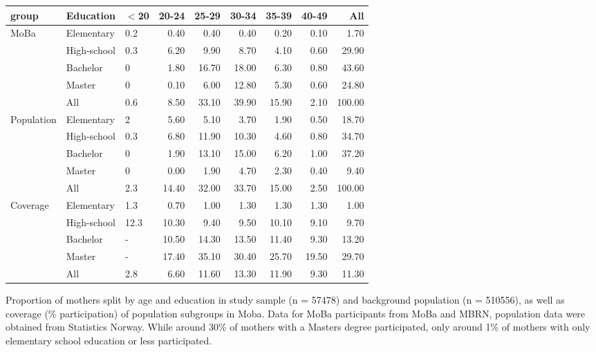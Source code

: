 
\centering
\begin{tabular}{lllrrrrrr}
  \hline
group & Education & $<$20 & 20-24 & 25-29 & 30-34 & 35-39 & 40-49 & All \\ 
  \hline
MoBa & Elementary & 0.2 & 0.40 & 0.40 & 0.40 & 0.20 & 0.10 & 1.70 \\ 
   & High-school & 0.3 & 6.20 & 9.90 & 8.70 & 4.10 & 0.60 & 29.90 \\ 
   & Bachelor & 0 & 1.80 & 16.70 & 18.00 & 6.30 & 0.80 & 43.60 \\ 
   & Master & 0 & 0.10 & 6.00 & 12.80 & 5.30 & 0.60 & 24.80 \\ 
   & All & 0.6 & 8.50 & 33.10 & 39.90 & 15.90 & 2.10 & 100.00 \\ 
  Population & Elementary & 2 & 5.60 & 5.10 & 3.70 & 1.90 & 0.50 & 18.70 \\ 
   & High-school & 0.3 & 6.80 & 11.90 & 10.30 & 4.60 & 0.80 & 34.70 \\ 
   & Bachelor & 0 & 1.90 & 13.10 & 15.00 & 6.20 & 1.00 & 37.20 \\ 
   & Master & 0 & 0.00 & 1.90 & 4.70 & 2.30 & 0.40 & 9.40 \\ 
   & All & 2.3 & 14.40 & 32.00 & 33.70 & 15.00 & 2.50 & 100.00 \\ 
  Coverage & Elementary & 1.3 & 0.70 & 1.00 & 1.30 & 1.30 & 1.30 & 1.00 \\ 
   & High-school & 12.3 & 10.30 & 9.40 & 9.50 & 10.10 & 9.10 & 9.70 \\ 
   & Bachelor & - & 10.50 & 14.30 & 13.50 & 11.40 & 9.30 & 13.20 \\ 
   & Master & - & 17.40 & 35.10 & 30.40 & 25.70 & 19.50 & 29.70 \\ 
   & All & 2.8 & 6.60 & 11.60 & 13.30 & 11.90 & 9.30 & 11.30 \\ 
   \hline
\end{tabular}
\caption{Proportion of mothers split by age and education in study sample (n = 57478) and background population (n = 510556), as well as coverage (\% participation) of population subgroups in Moba. Data for MoBa participants from MoBa and MBRN, population data were obtained from Statistics Norway. While around 30\% of mothers with a Masters degree participated, only around 1\% of mothers with only elementary school education or less participated.} 

